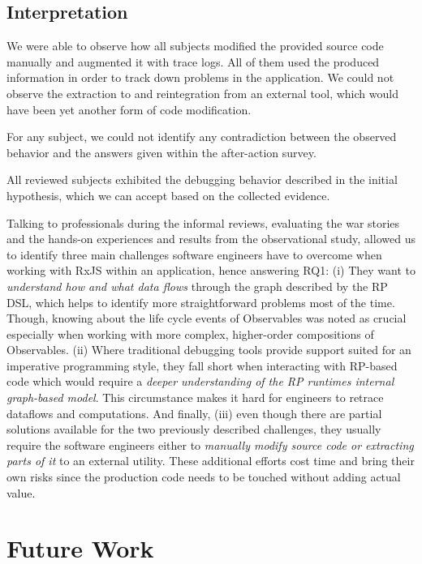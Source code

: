 \documentclass[12pt,a4paper]{article}
\begin{document}
\subsection{Interpretation}

We were able to observe how all subjects modified the provided source code manually and augmented it with trace logs. All of them used the produced information in order to track down problems in the application. We could not observe the extraction to and reintegration from an external tool, which would have been yet another form of code modification.

For any subject, we could not identify any contradiction between the observed behavior and the answers given within the after-action survey.

All reviewed subjects exhibited the debugging behavior described in the initial hypothesis, which we can accept based on the collected evidence.

Talking to professionals during the informal reviews, evaluating the war stories and the hands-on experiences and results from the observational study, allowed us to identify three main challenges software engineers have to overcome when working with RxJS within an application, hence answering RQ1: (i) They want to \emph{understand how and what data flows} through the graph described by the RP DSL, which helps to identify more straightforward problems most of the time. Though, knowing about the life cycle events of Observables was noted as crucial especially when working with more complex, higher-order compositions of Observables. (ii) Where traditional debugging tools provide support suited for an imperative programming style, they fall short when interacting with RP-based code which would require a \emph{deeper understanding of the RP runtimes internal graph-based model}. This circumstance makes it hard for engineers to retrace dataflows and computations. And finally, (iii) even though there are partial solutions available for the two previously described challenges, they usually require the software engineers either to \emph{manually modify source code or extracting parts of it} to an external utility. These additional efforts cost time and bring their own risks since the production code needs to be touched without adding actual value.

\section{Future Work}
\label{sec:future}
\end{document}
